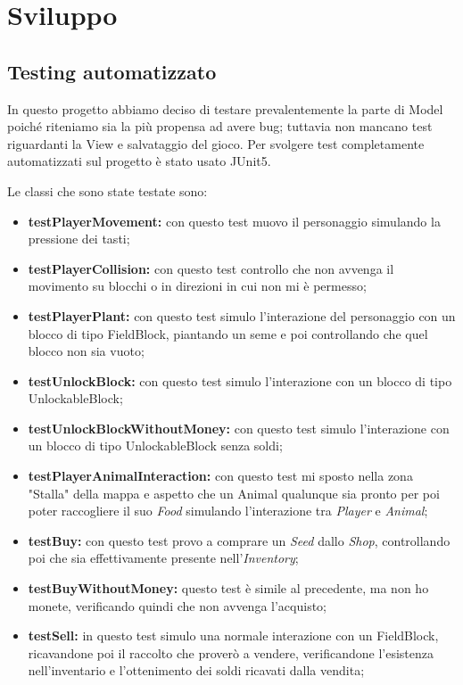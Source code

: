\documentclass[a4paper,12pt]{report}
\begin{document}
\chapter{Sviluppo}
\section{Testing automatizzato}


In questo progetto abbiamo deciso di testare prevalentemente la parte di Model poiché riteniamo sia la più propensa ad avere bug; tuttavia non mancano test riguardanti la View e salvataggio del gioco.
Per svolgere test completamente automatizzati sul progetto è stato usato JUnit5.
\hfill\break

{
Le classi che sono state testate sono:
\begin{itemize}
	\item \textbf{testPlayerMovement:} con questo test muovo il personaggio simulando la pressione dei tasti;
	\item \textbf{testPlayerCollision:} con questo test controllo che non avvenga il movimento su blocchi o in direzioni in cui non mi è permesso;
	\item \textbf{testPlayerPlant:} con questo test simulo l'interazione del personaggio con un blocco di tipo FieldBlock, piantando un seme e poi controllando che quel blocco non sia vuoto;
	\item \textbf{testUnlockBlock:} con questo test simulo l'interazione con un blocco di tipo UnlockableBlock;
	\item \textbf{testUnlockBlockWithoutMoney:} con questo test simulo l'interazione con un blocco di tipo UnlockableBlock senza soldi;
	\item \textbf{testPlayerAnimalInteraction:} con questo test mi sposto nella zona "Stalla" della mappa e aspetto che un Animal qualunque sia pronto per poi poter raccogliere il suo \textit{Food} simulando l'interazione tra \textit{Player} e \textit{Animal};
	\item \textbf{testBuy:} con questo test provo a comprare un \textit{Seed} dallo \textit{Shop}, controllando poi che sia effettivamente presente nell'\textit{Inventory};
	\item \textbf{testBuyWithoutMoney:} questo test è simile al precedente, ma non ho monete, verificando quindi che non avvenga l'acquisto;
	\item \textbf{testSell:} in questo test simulo una normale interazione con un FieldBlock, ricavandone poi il raccolto che proverò a vendere, verificandone l'esistenza nell'inventario e l'ottenimento dei soldi ricavati dalla vendita;

\end{itemize}}
\end{document}
